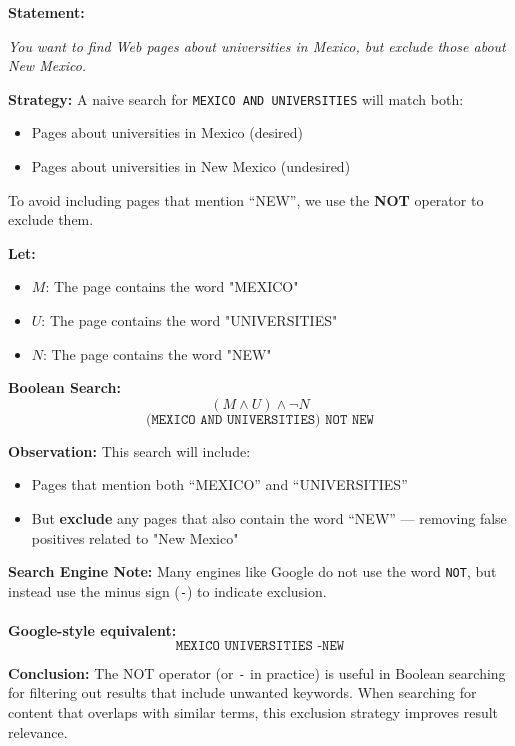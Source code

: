 \begin{tcolorbox}[title=Example 3: Boolean Searching Using NOT (Exclusion)]
\textbf{Statement:}  
\begin{center}
\textit{You want to find Web pages about universities in Mexico, but exclude those about New Mexico.}
\end{center}

\textbf{Strategy:}  
A naive search for \texttt{MEXICO AND UNIVERSITIES} will match both:
\begin{itemize}\setlength\itemsep{0em}
    \item Pages about universities in Mexico (desired)
    \item Pages about universities in New Mexico (undesired)
\end{itemize}

To avoid including pages that mention “NEW”, we use the \textbf{NOT} operator to exclude them.

\vspace{0.5em}

\textbf{Let:}
\begin{itemize}\setlength\itemsep{0em}
    \item $M$: The page contains the word "MEXICO"
    \item $U$: The page contains the word "UNIVERSITIES"
    \item $N$: The page contains the word "NEW"
\end{itemize}

\textbf{Boolean Search:}
\[
(M \land U) \land \neg N
\]
\[
\texttt{(MEXICO AND UNIVERSITIES) NOT NEW}
\]

\textbf{Observation:}  
This search will include:
\begin{itemize}\setlength\itemsep{0em}
    \item Pages that mention both “MEXICO” and “UNIVERSITIES”
    \item But \textbf{exclude} any pages that also contain the word “NEW” — removing false positives related to "New Mexico"
\end{itemize}

\vspace{0.5em}

\textbf{Search Engine Note:}  
Many engines like Google do not use the word \texttt{NOT}, but instead use the minus sign (\texttt{-}) to indicate exclusion.
\\ \\
\textbf{Google-style equivalent:}
\[
\texttt{MEXICO UNIVERSITIES -NEW}
\]

\textbf{Conclusion:}  
The NOT operator (or \texttt{-} in practice) is useful in Boolean searching for filtering out results that include unwanted keywords. When searching for content that overlaps with similar terms, this exclusion strategy improves result relevance.
\end{tcolorbox}
